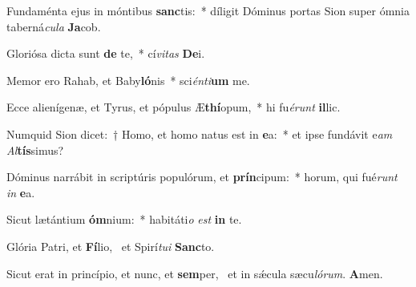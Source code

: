 \item Fundaménta ejus in móntibus \textbf{sanc}tis:~* díligit Dóminus portas Sion super ómnia taberná\textit{cu}\textit{la} \textbf{Ja}cob.
\item Gloriósa dicta sunt \textbf{de} te,~* cí\textit{vi}\textit{tas} \textbf{De}i.
\item Memor ero Rahab, et Baby\textbf{ló}nis~* sci\textit{én}\textit{ti}\textbf{um} me.
\item Ecce alienígenæ, et Tyrus, et pópulus Æ\textbf{thí}opum,~* hi fu\textit{é}\textit{runt} \textbf{il}lic.
\item Numquid Sion dicet:~† Homo, et homo natus est in \textbf{e}a:~* et ipse fundávit e\textit{am} \textit{Al}\textbf{tís}simus?
\item Dóminus narrábit in scriptúris populórum, et \textbf{prín}cipum:~* horum, qui fué\textit{runt} \textit{in} \textbf{e}a.
\item Sicut lætántium \textbf{óm}nium:~* habitáti\textit{o} \textit{est} \textbf{in} te.
\item Glória Patri, et \textbf{Fí}lio,~\psstar{} et Spirí\textit{tu}\textit{i} \textbf{Sanc}to.
\item Sicut erat in princípio, et nunc, et \textbf{sem}per,~\psstar{} et in sǽcula sæcu\textit{ló}\textit{rum}. \textbf{A}men.
